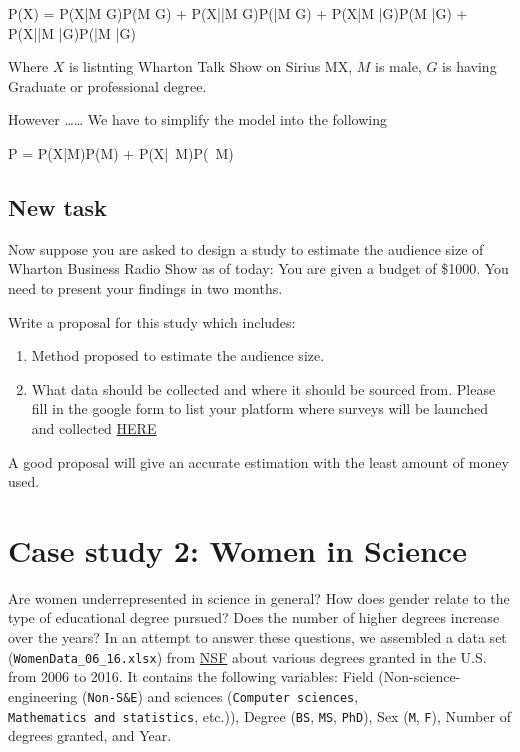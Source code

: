 \documentclass[
]{article}
\providecommand{\tightlist}{%
  \setlength{\itemsep}{0pt}\setlength{\parskip}{0pt}}
\begin{document}
P(X) = P(X|M \cap G)P(M \cap G) + P(X|\bar{M} \cap G)P(\bar{M} \cap G) + P(X|M \cap \bar{G})P(M \cap \bar{G}) + P(X|\bar{M} \cap \bar{G})P(\bar{M} \cap \bar{G})

Where \(X\) is listnting Wharton Talk Show on Sirius MX, \(M\) is male,
\(G\) is having Graduate or professional degree.

However \ldots\ldots{} We have to simplify the model into the following

P = P(X|M)P(M) + P(X|~M)P(~M)

\hypertarget{new-task}{%
\subsection{New task}\label{new-task}}

Now suppose you are asked to design a study to estimate the audience
size of Wharton Business Radio Show as of today: You are given a budget
of \$1000. You need to present your findings in two months.

Write a proposal for this study which includes:

\begin{enumerate}
\def\labelenumi{\arabic{enumi}.}
\tightlist
\item
  Method proposed to estimate the audience size.
\item
  What data should be collected and where it should be sourced from.
  Please fill in the google form to list your platform where surveys
  will be launched and collected
  \href{https://forms.gle/8SmjFQ1tpqr6c4sa8}{HERE}
\end{enumerate}

A good proposal will give an accurate estimation with the least amount
of money used.

\hypertarget{case-study-2-women-in-science}{%
\section{Case study 2: Women in
Science}\label{case-study-2-women-in-science}}

Are women underrepresented in science in general? How does gender relate
to the type of educational degree pursued? Does the number of higher
degrees increase over the years? In an attempt to answer these
questions, we assembled a data set (\texttt{WomenData\_06\_16.xlsx})
from
\href{https://ncses.nsf.gov/pubs/nsf19304/digest/field-of-degree-women}{NSF}
about various degrees granted in the U.S. from 2006 to 2016. It contains
the following variables: Field (Non-science-engineering
(\texttt{Non-S\&E}) and sciences (\texttt{Computer\ sciences},
\texttt{Mathematics\ and\ statistics}, etc.)), Degree (\texttt{BS},
\texttt{MS}, \texttt{PhD}), Sex (\texttt{M}, \texttt{F}), Number of
degrees granted, and Year.
\end{document}
